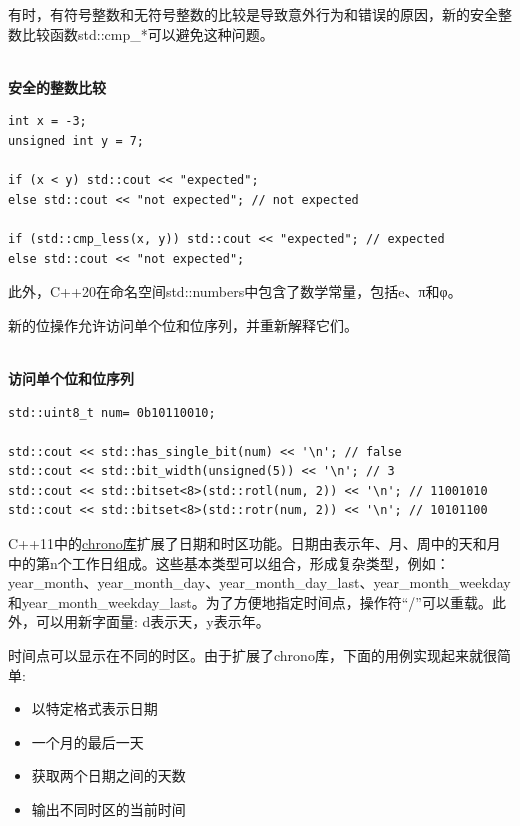 
有时，有符号整数和无符号整数的比较是导致意外行为和错误的原因，新的安全整数比较函数std::cmp\_*可以避免这种问题。

\hspace*{\fill} \\ %
\noindent
\textbf{安全的整数比较}
\begin{lstlisting}[style=styleCXX]
int x = -3;
unsigned int y = 7;

if (x < y) std::cout << "expected";
else std::cout << "not expected"; // not expected

if (std::cmp_less(x, y)) std::cout << "expected"; // expected
else std::cout << "not expected";
\end{lstlisting}

此外，C++20在命名空间std::numbers中包含了数学常量，包括e、π和φ。

新的位操作允许访问单个位和位序列，并重新解释它们。

\hspace*{\fill} \\ %
\noindent
\textbf{访问单个位和位序列}
\begin{lstlisting}[style=styleCXX]
std::uint8_t num= 0b10110010;

std::cout << std::has_single_bit(num) << '\n'; // false
std::cout << std::bit_width(unsigned(5)) << '\n'; // 3
std::cout << std::bitset<8>(std::rotl(num, 2)) << '\n'; // 11001010
std::cout << std::bitset<8>(std::rotr(num, 2)) << '\n'; // 10101100
\end{lstlisting}


C++11中的\href{https://en.cppreference.com/w/cpp/chrono}{chrono库}扩展了日期和时区功能。日期由表示年、月、周中的天和月中的第n个工作日组成。这些基本类型可以组合，形成复杂类型，例如：year\_month、year\_month\_day、year\_month\_day\_last、year\_month\_weekday和year\_month\_weekday\_last。为了方便地指定时间点，操作符“/”可以重载。此外，可以用新字面量: d表示天，y表示年。

时间点可以显示在不同的时区。由于扩展了chrono库，下面的用例实现起来就很简单:

\begin{itemize}
\item 
以特定格式表示日期

\item 
一个月的最后一天

\item 
获取两个日期之间的天数

\item 
输出不同时区的当前时间
\end{itemize}

